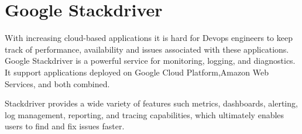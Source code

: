 \section{Google Stackdriver}

With increasing cloud-based applications it is hard for Devops engineers to keep
track of performance, availability and issues associated with these applications.
Google Stackdriver is a powerful service for monitoring, logging, and diagnostics. 
It support applications deployed on Google Cloud Platform,Amazon Web Services, and both combined.

Stackdriver provides a wide variety of features such metrics, dashboards, 
alerting, log management, reporting, and tracing capabilities, which 
ultimately enables users to find and fix issues faster. 
\cite{hid-sp18-602-google-stackdriver-main} 

